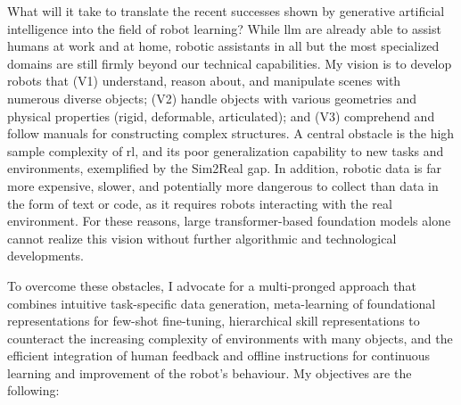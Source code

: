 \documentclass{erc-B2}
\begin{document}
What will it take to translate the recent successes shown by generative artificial intelligence into the field of robot learning?
While \gls*{llm} are already able to assist humans at work and at home, robotic assistants in all but the most specialized domains are still firmly beyond our technical capabilities.
My vision is to develop robots that (V1) understand, reason about, and manipulate scenes with numerous diverse objects; (V2) handle objects with various geometries and physical properties (rigid, deformable, articulated); and (V3) comprehend and follow manuals for constructing complex structures.
A central obstacle is the high sample complexity of \gls*{rl}, and its poor generalization capability to new tasks and environments, exemplified by the Sim2Real gap.
In addition, robotic data is far more expensive, slower, and potentially more dangerous to collect than data in the form of text or code, as it requires robots interacting with the real environment.
For these reasons, large transformer-based foundation models alone cannot realize this vision without further algorithmic and technological developments.

To overcome these obstacles, I advocate for a multi-pronged approach that combines intuitive task-specific data generation, meta-learning of foundational representations for few-shot fine-tuning, hierarchical skill representations to counteract the increasing complexity of environments with many objects, and the efficient integration of human feedback and offline instructions for continuous learning and improvement of the robot's behaviour.
My objectives are the following:
\end{document}
